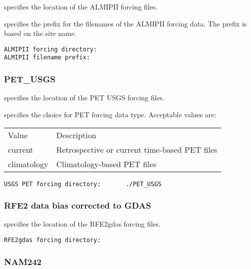  
  specifies the location of the
 ALMIPII forcing files.

  specifies the prefix for the filenames
 of the ALMIPII forcing data.  The prefix is based on the site name.
 

 \begin{Verbatim}[frame=single]
ALMIPII forcing directory:
ALMIPII filename prefix:
 \end{Verbatim}
 

 
 \subsubsection{PET\_USGS} \label{sssec:supp_petusgs}
 

 
  specifies the location of the
 PET USGS forcing files.

  specifies the choice for PET forcing
  data type.
 Acceptable values are:

 \begin{tabular}{ll}
 Value & Description    \\
  current       & Retrospective or current time-based PET files  \\
  climatology   & Climatology-based PET files  \\
 \end{tabular}
 

 \begin{Verbatim}[frame=single]
USGS PET forcing directory:       ./PET_USGS
 \end{Verbatim}

 
 \subsubsection{RFE2 data bias corrected to GDAS} \label{sssec:rfe2gdas}
 

 
  specifies the location of the
 RFE2gdas forcing files.
 

 \begin{Verbatim}[frame=single]
RFE2gdas forcing directory:
 \end{Verbatim}

 
 \subsubsection{NAM242} \label{sssec:supp_nam242}
 

